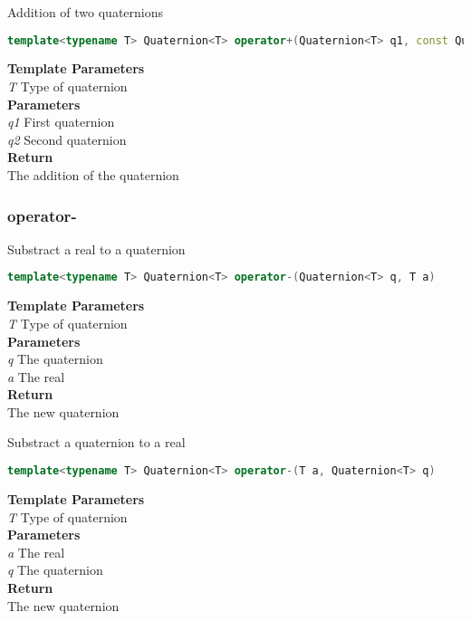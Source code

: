 \begin{mdframed}
Addition of two quaternions
\begin{lstlisting}[language=C++]
template<typename T> Quaternion<T> operator+(Quaternion<T> q1, const Quaternion<T>& q2) 
\end{lstlisting}
\textbf{Template Parameters} \\ 
\textit{T} Type of quaternion \\ 
\textbf{Parameters} \\ 
\textit{q1} First quaternion \\ 
\textit{q2} Second quaternion \\ 
\textbf{Return} \\ 
The addition of the quaternion\\ 
\end{mdframed}

\subsubsection{operator-}
\begin{mdframed}
Substract a real to a quaternion
\begin{lstlisting}[language=C++]
template<typename T> Quaternion<T> operator-(Quaternion<T> q, T a) 
\end{lstlisting}
\textbf{Template Parameters} \\ 
\textit{T} Type of quaternion \\ 
\textbf{Parameters} \\ 
\textit{q} The quaternion \\ 
\textit{a} The real \\ 
\textbf{Return} \\ 
The new quaternion\\ 
\end{mdframed}

\begin{mdframed}
Substract a quaternion to a real
\begin{lstlisting}[language=C++]
template<typename T> Quaternion<T> operator-(T a, Quaternion<T> q) 
\end{lstlisting}
\textbf{Template Parameters} \\ 
\textit{T} Type of quaternion \\ 
\textbf{Parameters} \\ 
\textit{a} The real \\ 
\textit{q} The quaternion \\ 
\textbf{Return} \\ 
The new quaternion\\ 
\end{mdframed}

